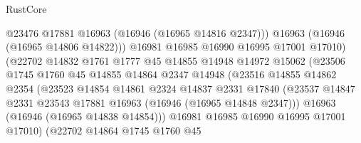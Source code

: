 \begin{lexlean}{RustCore}
\begin{coremodule}
                                    @23476
                                    @17881
                                    @16963
                                    (@16946 (@16965 @14816 @2347)))
                                  @16963
                                  (@16946 (@16965 @14806 @14822)))
                                @16981
                                @16985
                                @16990
                                @16995
                                @17001
                                @17010)
                              (@22702
                                @14832
                                @1761
                                @1777
                                @45
                                @14855
                                @14948
                                @14972
                                @15062
                                (@23506
                                  @1745
                                  @1760
                                  @45
                                  @14855
                                  @14864
                                  @2347
                                  @14948
                                  (@23516
                                    @14855
                                    @14862
                                    @2354
                                    (@23523
                                      @14854
                                      @14861
                                      @2324
                                      @14837
                                      @2331
                                      @17840
                                      (@23537
                                        @14847
                                        @2331
                                        @23543
                                        @17881
                                        @16963
                                        (@16946 (@16965 @14848 @2347)))
                                      @16963
                                      (@16946 (@16965 @14838 @14854)))
                                    @16981
                                    @16985
                                    @16990
                                    @16995
                                    @17001
                                    @17010)
                                  (@22702
                                    @14864
                                    @1745
                                    @1760
                                    @45

\end{coremodule}
\end{lexlean}

